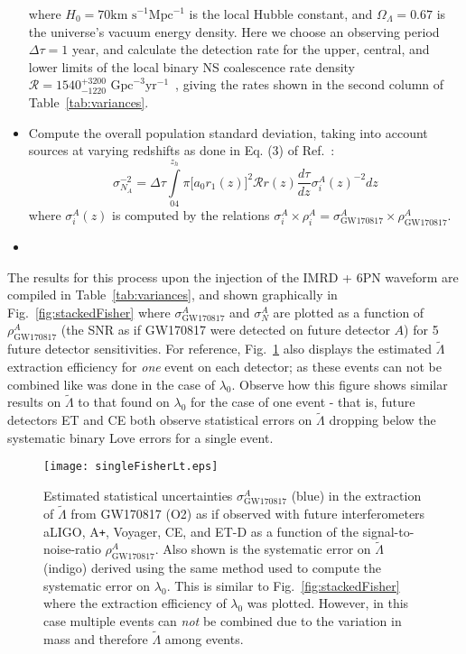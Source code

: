 \documentclass[prd,twocolumn,nofootinbib,superscriptaddress,amsmath,amssymb]{revtex4-1}
\begin{document}
\begin{itemize}
where $H_0 = 70 \text{km s}^{-1}\text{Mpc}^{-1}$ is the local Hubble constant, and $\Omega_{\Lambda}=0.67$ is the universe's vacuum energy density.
Here we choose an observing period $\Delta \tau = 1$ year, and calculate the detection rate for the upper, central, and lower limits of the local binary NS coalescence rate density $\mathcal{R}=1540^{+3200}_{-1220} \text{ Gpc}^{-3}\text{yr}^{-1}$~\cite{Abbott2017}, giving the rates shown in the second column of Table~\ref{tab:variances}.
\item Compute the overall population standard deviation, taking into account sources at varying redshifts as done in Eq. (3) of Ref.~\cite{Takahiro}:
\begin{equation}
\sigma_{N_A}^{-2}=\Delta \tau \int\limits^{z_h}_04 \pi \lbrack a_0 r_1(z)\rbrack^2 \mathcal{R}r(z)\frac{d\tau}{dz}\sigma^A_i(z)^{-2}dz
\end{equation}
where $\sigma_i^A(z)$ is computed by the relations $\sigma_i^A \times \rho_i^A = \sigma_{\text{GW170817}}^A \times \rho_{\text{GW170817}}^A$.
\item {}
\end{itemize}

The results for this process upon the injection of the IMRD + 6PN waveform are compiled in Table~\ref{tab:variances}, and shown graphically in Fig.~\ref{fig:stackedFisher} where $\sigma^A_{\text{GW170817}}$ and $\sigma^A_N$ are plotted as a function of $\rho^A_{\text{GW170817}}$ (the SNR as if GW170817 were detected on future detector $A$) for 5 future detector sensitivities.
For reference, Fig.~\ref{fig:singleFisherLt} also displays the estimated $\tilde\Lambda$ extraction efficiency for \emph{one} event on each detector; as these events can not be combined like was done in the case of $\lambda_0$.
Observe how this figure shows similar results on $\tilde\Lambda$ to that found on $\lambda_0$ for the case of one event - that is, future detectors ET and CE both observe statistical errors on $\tilde\Lambda$ dropping below the systematic binary Love errors for a single event.
\begin{figure}
\begin{center} 
\texttt{[image: singleFisherLt.eps]}
\end{center}
\caption{
Estimated statistical uncertainties $\sigma^A_{\text{GW170817}}$ (blue) in the extraction of $\tilde\Lambda$ from GW170817 (O2) as if observed with future interferometers aLIGO, A\texttt{+}, Voyager, CE, and ET-D as a function of the signal-to-noise-ratio $\rho^A_{\text{GW170817}}$.
Also shown is the systematic error on $\tilde\Lambda$ (indigo) derived using the same method used to compute the systematic error on $\lambda_0$.
This is similar to Fig.~\ref{fig:stackedFisher} where the extraction efficiency of $\lambda_0$ was plotted.
However, in this case multiple events can \emph{not} be combined due to the variation in mass and therefore $\tilde\Lambda$ among events.
}
\label{fig:singleFisherLt}
\end{figure} 
\end{document}
